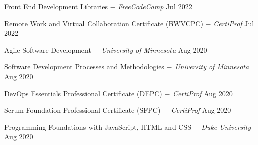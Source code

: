 {Front End Development Libraries} $-$ \emph{FreeCodeCamp} \hfill Jul 2022\par
{{Remote Work and Virtual Collaboration Certificate (RWVCPC)} $-$ \emph{CertiProf}} \hfill Jul 2022\par
{{Agile Software Development} $-$ \emph{University of Minnesota}} \hfill Aug 2020\par
{{Software Development Processes and Methodologies} $-$ \emph{University of Minnesota}} \hfill Aug 2020\par
{{DevOps Essentials Professional Certificate (DEPC)} $-$ \emph{CertiProf}} \hfill Aug 2020\par
{{Scrum Foundation Professional Certificate (SFPC)} $-$ \emph{CertiProf}} \hfill Aug 2020\par
{{Programming Foundations with JavaScript, HTML and CSS } $-$ \emph{Duke University}} \hfill Aug 2020\par